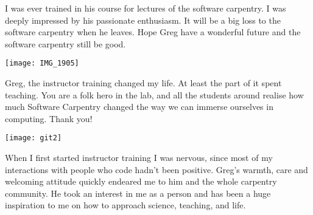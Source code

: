 I was ever trained in his course for lectures of the software carpentry. I was
deeply impressed by his passionate enthusiasm. It will be a big loss to the
software carpentry when he leaves. Hope Greg have a wonderful future and the
software carpentry still be good.

\vspace*{\fill}

\newpage
\vspace*{\fill}

\begin{center}
\texttt{[image: IMG\_1905]}
\end{center}

Greg, the instructor training changed my life. At least the part of it spent
teaching. You are a folk hero in the lab, and all the students around realise
how much Software Carpentry changed the way we can immerse ourselves in
computing. Thank you!

\vspace*{\fill}

\newpage
\vspace*{\fill}

\texttt{[image: git2]}

When I first started instructor training I was nervous, since most of my
interactions with people who code hadn't been positive. Greg's warmth, care and
welcoming attitude quickly endeared me to him and the whole carpentry
community. He took an interest in me as a person and has been a huge
inspiration to me on how to approach science, teaching, and life. 

\vspace*{\fill}

